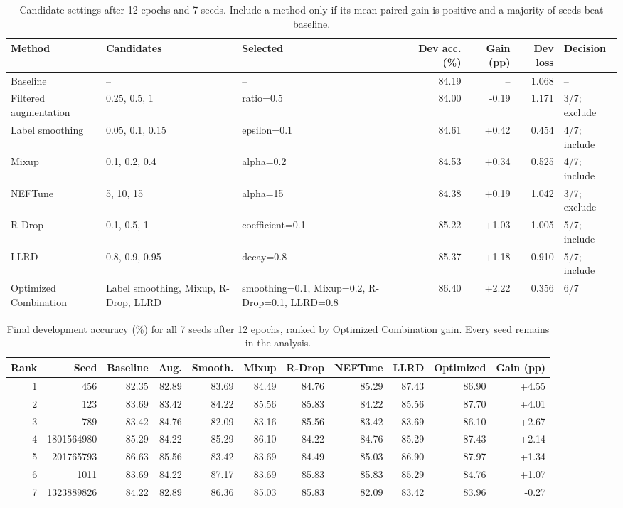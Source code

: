\begin{table}[tp]
\centering\scriptsize\setlength{\tabcolsep}{3pt}
\caption{Candidate settings after 12 epochs and 7 seeds. Include a method only if its mean paired gain is positive and a majority of seeds beat baseline.}
\label{tab:selected-hyperparameters}
\begin{tabular}{p{}p{}p{}rrrp{}}
\toprule
Method & Candidates & Selected & Dev acc. (\%) & Gain (pp) & Dev loss & Decision \\
\midrule
Baseline & -- & -- & 84.19 & -- & 1.068 & -- \\
Filtered augmentation & 0.25, 0.5, 1 & ratio=0.5 & 84.00 & -0.19 & 1.171 & 3/7; exclude \\
Label smoothing & 0.05, 0.1, 0.15 & epsilon=0.1 & 84.61 & +0.42 & 0.454 & 4/7; include \\
Mixup & 0.1, 0.2, 0.4 & alpha=0.2 & 84.53 & +0.34 & 0.525 & 4/7; include \\
NEFTune & 5, 10, 15 & alpha=15 & 84.38 & +0.19 & 1.042 & 3/7; exclude \\
R-Drop & 0.1, 0.5, 1 & coefficient=0.1 & 85.22 & +1.03 & 1.005 & 5/7; include \\
LLRD & 0.8, 0.9, 0.95 & decay=0.8 & 85.37 & +1.18 & 0.910 & 5/7; include \\
Optimized Combination & Label smoothing, Mixup, R-Drop, LLRD & smoothing=0.1, Mixup=0.2, R-Drop=0.1, LLRD=0.8 & 86.40 & +2.22 & 0.356 & 6/7 \\
\bottomrule
\end{tabular}
\end{table}
\begin{table}[tp]
\centering\scriptsize\setlength{\tabcolsep}{3pt}
\caption{Final development accuracy (\%) for all 7 seeds after 12 epochs, ranked by Optimized Combination gain. Every seed remains in the analysis.}
\label{tab:selected-seeds}
\begin{tabular}{rrrrrrrrrrr}
\toprule
Rank & Seed & Baseline & Aug. & Smooth. & Mixup & R-Drop & NEFTune & LLRD & Optimized & Gain (pp) \\
\midrule
1 & 456 & 82.35 & 82.89 & 83.69 & 84.49 & 84.76 & 85.29 & 87.43 & 86.90 & +4.55 \\
2 & 123 & 83.69 & 83.42 & 84.22 & 85.56 & 85.83 & 84.22 & 85.56 & 87.70 & +4.01 \\
3 & 789 & 83.42 & 84.76 & 82.09 & 83.16 & 85.56 & 83.42 & 83.69 & 86.10 & +2.67 \\
4 & 1801564980 & 85.29 & 84.22 & 85.29 & 86.10 & 84.22 & 84.76 & 85.29 & 87.43 & +2.14 \\
5 & 201765793 & 86.63 & 85.56 & 83.42 & 83.69 & 84.49 & 85.03 & 86.90 & 87.97 & +1.34 \\
6 & 1011 & 83.69 & 84.22 & 87.17 & 83.69 & 85.83 & 85.83 & 85.29 & 84.76 & +1.07 \\
7 & 1323889826 & 84.22 & 82.89 & 86.36 & 85.03 & 85.83 & 82.09 & 83.42 & 83.96 & -0.27 \\
\bottomrule
\end{tabular}
\end{table}
